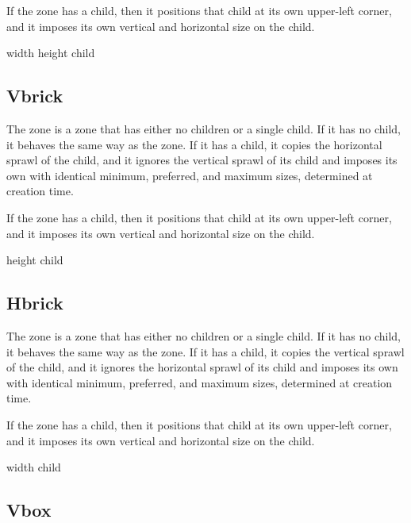 If the  zone has a child, then it positions that child at
its own upper-left corner, and it imposes its own vertical and
horizontal size on the child.


 {width height \optional child}

\subsection{Vbrick}
\label{sec-zones-layout-vbrick}

The  zone is a zone that has either no children or a
single child.  If it has no child, it behaves the same way as the
 zone.   If it has a
child, it copies the horizontal sprawl of the child, and it ignores
the vertical sprawl of its child and imposes its own with identical
minimum, preferred, and maximum sizes, determined at creation time.

If the  zone has a child, then it positions that child at
its own upper-left corner, and it imposes its own vertical and
horizontal size on the child.


 {height \optional child}

\subsection{Hbrick}
\label{sec-zones-layout-hbrick}

The  zone is a zone that has either no children or a
single child.  If it has no child, it behaves the same way as the
 zone.   If it has a
child, it copies the vertical sprawl of the child, and it ignores
the horizontal sprawl of its child and imposes its own with identical
minimum, preferred, and maximum sizes, determined at creation time.

If the  zone has a child, then it positions that child at
its own upper-left corner, and it imposes its own vertical and
horizontal size on the child.


 {width \optional child}

\subsection{Vbox}
\label{sec-zones-layout-vbox}


